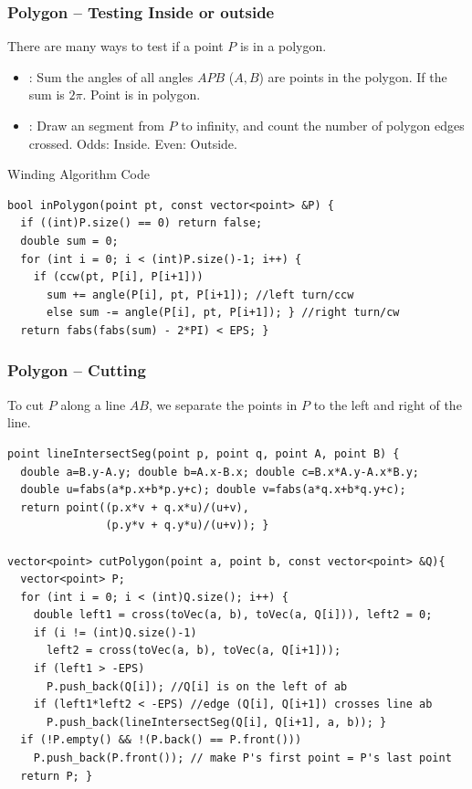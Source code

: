 \documentclass{beamer}
\begin{document}
\begin{frame}
  \frametitle{Polygon -- Testing Inside or outside}
  {\smaller
    \begin{block}{There are many ways to test if a point $P$ is in a polygon.}
      \begin{itemize}
      \item {}: Sum the angles of all
        angles $APB$ ($A,B$) are points in the polygon. If the sum is
        $2\pi$. Point is in polygon. 
      \item {}: Draw an segment from
        $P$ to infinity, and count the number of polygon edges
        crossed. Odds: Inside. Even: Outside.
      \end{itemize}
    \end{block}

    \begin{exampleblock}{Winding Algorithm Code}
\begin{verbatim}
bool inPolygon(point pt, const vector<point> &P) {
  if ((int)P.size() == 0) return false;
  double sum = 0;
  for (int i = 0; i < (int)P.size()-1; i++) {
    if (ccw(pt, P[i], P[i+1]))
      sum += angle(P[i], pt, P[i+1]); //left turn/ccw
      else sum -= angle(P[i], pt, P[i+1]); } //right turn/cw
  return fabs(fabs(sum) - 2*PI) < EPS; }
\end{verbatim}
    \end{exampleblock}
  }
\end{frame}

\begin{frame}
  \frametitle{Polygon -- Cutting}
  {\smaller
    \begin{block}{}
      To cut $P$ along a line $AB$, we separate the points in $P$ to the 
      left and right of the line.
    \end{block}
    
{\smaller
    \begin{exampleblock}{}
\begin{verbatim}
point lineIntersectSeg(point p, point q, point A, point B) {
  double a=B.y-A.y; double b=A.x-B.x; double c=B.x*A.y-A.x*B.y;
  double u=fabs(a*p.x+b*p.y+c); double v=fabs(a*q.x+b*q.y+c);
  return point((p.x*v + q.x*u)/(u+v), 
               (p.y*v + q.y*u)/(u+v)); }

vector<point> cutPolygon(point a, point b, const vector<point> &Q){
  vector<point> P;
  for (int i = 0; i < (int)Q.size(); i++) {
    double left1 = cross(toVec(a, b), toVec(a, Q[i])), left2 = 0;
    if (i != (int)Q.size()-1) 
      left2 = cross(toVec(a, b), toVec(a, Q[i+1]));
    if (left1 > -EPS) 
      P.push_back(Q[i]); //Q[i] is on the left of ab
    if (left1*left2 < -EPS) //edge (Q[i], Q[i+1]) crosses line ab
      P.push_back(lineIntersectSeg(Q[i], Q[i+1], a, b)); }
  if (!P.empty() && !(P.back() == P.front()))
    P.push_back(P.front()); // make P's first point = P's last point
  return P; }
\end{verbatim}
    \end{exampleblock}}
  }
\end{frame}
\end{document}
